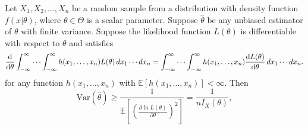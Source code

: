 \begin{lemma}
    Let $X_1, X_2, \ldots, X_n$ be a random sample from a distribution with density function $f(x|\theta)$, 
    where $\theta \in \Theta$ is a scalar parameter. Suppose $\widehat{\theta}$ be any unbiased estimator of $\theta$ with finite variance.
    Suppose the likelihood function $L(\theta)$ is differentiable with respect to $\theta$ and satisfies
    \begin{equation}
        \odv{}{\theta} \int_{-\infty}^{\infty} \cdots \int_{-\infty}^{\infty} h(x_1, \ldots, x_n) L(\theta) \, dx_1 \cdots dx_n = \int_{-\infty}^{\infty} \cdots \int_{-\infty}^{\infty} h(x_1, \ldots, x_n) \odv{L(\theta)}{\theta} \, dx_1 \cdots dx_n.
    \end{equation}
    for any function $h(x_1, \ldots, x_n)$ with $\mathbb{E}[h(x_1, \ldots, x_n)] < \infty$. Then
    \begin{equation}
        \text{Var}(\widehat{\theta}) \geq \frac{1}{\mathbb{E} \left[ \left( \frac{\partial \ln L(\theta)}{\partial \theta} \right)^2 \right] } = \frac{1}{nI_X(\theta)},
    \end{equation}
\end{lemma}
